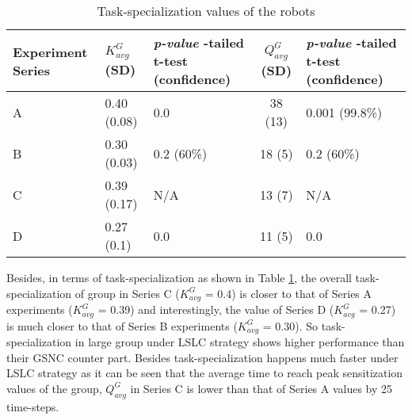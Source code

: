 \begin{table}[H]
\begin{center}
\caption{Task-specialization values of the robots}
\begin{tabular}{|p{0.7in}|p{0.7in}|m{0.7in}|c|m{0.7in}|}
\hline Experiment \protect\newline Series & $ K^G_{avg}$ (SD) & \textit{ p-value} \protect\newline 1-tailed t-test (confidence)  & $ Q^G_{avg}$ (SD) & \textit{ p-value} \protect\newline 1-tailed t-test \protect\newline (confidence) \\ 
\hline A & 0.40 (0.08)& 0.0 & 38 (13) & 0.001 (99.8\%)\\ 
\hline B &  0.30 (0.03) & 0.2 (60\%) &  18 (5) & 0.2 (60\%)\\
\hline C  & 0.39 (0.17) & N/A & 13 (7) & N/A \\
\hline D  & 0.27 (0.1)& 0.0 & 11 (5) & 0.0\\
\hline
\end{tabular}
\label{table:k-cmp} 
\end{center}
\end{table}
Besides, in terms of task-specialization as shown in Table \ref{table:k-cmp}, the overall task-specialization of group in Series C ($K^G_{avg}$ = 0.4) is  closer to that of Series A experiments ($K^G_{avg}$ = 0.39) and interestingly, the value of  Series D ($K^G_{avg}$ = 0.27) is  much closer to that of Series B experiments ($K^G_{avg}$ = 0.30). So task-specialization in large group under LSLC strategy shows higher performance than their GSNC counter part. Besides task-specialization happens much faster under LSLC strategy as it can be seen that the average time to reach peak sensitization values  of the group,  $Q^G_{avg}$ in Series C is lower than that of Series A values by 25 time-steps.

